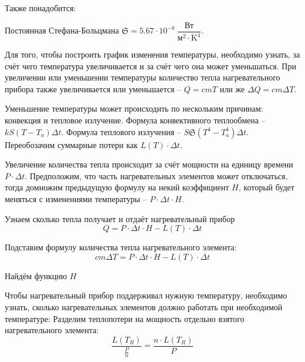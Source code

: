 \documentclass[a4paper, 14pt, titlepage, fleqn]{extarticle}
\begin{document}
            Также понадобится:

            Постоянная Стефана-Больцмана $\mathfrak{S} = 5.67 \cdot 10^{-8} \ \dfrac{\text{Вт}}{\text{м}^2 \cdot \text{K}^4}$.

            Для того, чтобы построить график изменения температуры, необходимо узнать, за счёт чего температура увеличивается и за счёт чего она может уменьшаться.
            При увеличении или уменьшении температуры количество тепла нагревательного прибора также увеличивается или уменьшается -- \( Q = c m T \) или же \( \Delta Q = c m \Delta T \).
            
            Уменьшение температуры может происходить по нескольким причинам: конвекция и тепловое излучение. 
            Формула конвективного теплообмена -- \( k S \left( T - T_a \right) \Delta t \).
            Формула теплового излучения -- \( S \mathfrak{S} \left( T^4 - T_a^4 \right) \Delta t \).
            Переобозачим суммарные потери как $L\left( T \right) \cdot \Delta t$.
            
            Увеличение количества тепла происходит за счёт мощности на единицу времени \(P \cdot \Delta t\).
            Предположим, что часть нагревательных элементов может отключаться, тогда домножим предыдущую формулу на некий коэффициент $H$, который будет меняться с изменениями температуры -- \( P \cdot \Delta t \cdot H \).
            
        
            Узнаем сколько тепла получает и отдаёт нагревательный прибор
            \[ Q = P \cdot \Delta t \cdot H - L\left( T \right) \cdot \Delta t \]

            Подставим формулу количества тепла нагревательного элемента:
            \begin{equation}
                c m \Delta T = P \cdot \Delta t \cdot H - L\left( T \right) \cdot \Delta t
            \end{equation}

            Найдём функцию \(H\) 

            Чтобы нагревательный прибор поддерживал нужную температуру, необходимо узнать, сколько нагревательных элементов должно работать при необходимой температуре:
            Разделим теплопотери на мощность отдельно взятого нагревательного элемента:
            \[ \dfrac{L\left( T_R \right)}{\tfrac{P}{n}} = \dfrac{n \cdot L\left( T_R \right)}{P} \]
\end{document}
